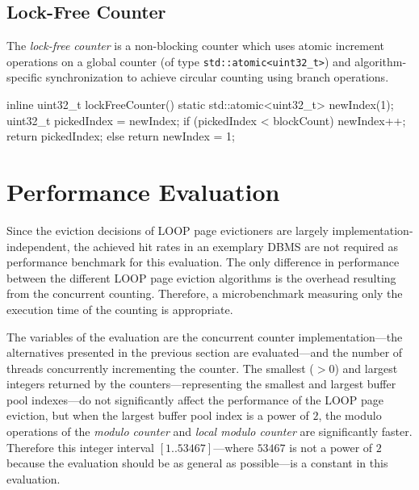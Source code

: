 \subsection[Lock-Free Counter]{Lock-Free Counter} \label{subsec:clunky_counter}

    The \emph{lock-free counter} is a non-blocking counter which uses atomic increment operations on a global counter (of type \lstinline{std::atomic<uint32_t>}) and algorithm-specific synchronization to achieve circular counting using branch operations.

\begin{@empty}
    \lstset{
        language = [ISO]C++
    }
\begin{centeredshadowboxlisting}
inline uint32_t lockFreeCounter() {
    static std::atomic<uint32_t> newIndex(1);
    uint32_t pickedIndex = newIndex;
    if (pickedIndex < blockCount) {
        newIndex++;
        return pickedIndex;
    } else {
        return newIndex = 1;
    }
}
\end{centeredshadowboxlisting}
\end{@empty}

\section[Performance Evaluation]{Performance Evaluation} \label{sec:loop-performance}

    Since the eviction decisions of LOOP page evictioners are largely im\-ple\-men\-ta\-tion-independent, the achieved hit rates in an exemplary DBMS are not required as performance benchmark for this evaluation. The only difference in performance between the different LOOP page eviction algorithms is the overhead resulting from the concurrent counting. Therefore, a microbenchmark measuring only the execution time of the counting is appropriate.

    The variables of the evaluation are the concurrent counter im\-ple\-men\-ta\-tion---the alternatives presented in the previous section are evaluated---and the number of threads concurrently incrementing the counter. The smallest ($>0$) and largest integers returned by the counters---representing the smallest and largest buffer pool indexes---do not significantly affect the performance of the LOOP page eviction, but when the largest buffer pool index is a power of $2$, the modulo operations of the \emph{modulo counter} and \emph{local modulo counter} are significantly faster. Therefore this integer interval $\left[1 .. 53467\right]$---where $53467$ is not a power of $2$ because the evaluation should be as general as possible---is a constant in this evaluation.

